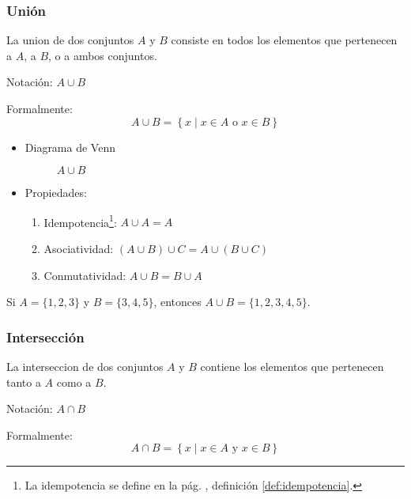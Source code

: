 \subsubsection{Unión }
\vspace{1em} 
\begin{fmd-definition}[Unión]
	La \gls{union} de dos conjuntos \(A\) y \(B\) consiste en todos los elementos que pertenecen a \(A\), a \(B\), o a ambos conjuntos.
	
	Notación: \(A \cup B\)
	
	Formalmente:
	\[ A \cup B = \left\{ x \mid x \in A \mbox{ o } x \in B \right\} \]
\end{fmd-definition}

\begin{itemize}
	\item Diagrama de Venn
	\begin{figure}[H]
		\centering
		\begin{venndiagram2sets}
			\fillA \fillB
		\end{venndiagram2sets}
		\caption*{$A \cup B$}
	\end{figure}
	
	\item Propiedades:
	\begin{enumerate}[label=\roman*)]
		\item Idempotencia\footnote{La idempotencia se define en la pág.  \pageref{def:idempotencia}, definición \ref{def:idempotencia}.}: \( A \cup A = A \)
		\item Asociatividad: \( \left( A \cup B \right) \cup C = A \cup \left( B \cup C \right) \)
		\item Conmutatividad: \( A \cup B = B \cup A\)
	\end{enumerate}
\end{itemize}

\begin{example}[Unión]
	Si \(A = \{1, 2, 3\}\) y \(B = \{3, 4, 5\}\), entonces \(A \cup B = \{1, 2, 3, 4, 5\}\).
\end{example}

\subsubsection{Intersección }
\vspace{1em} 
\begin{fmd-definition}[Intersección]
	La \gls{interseccion} de dos conjuntos \(A\) y \(B\) contiene los elementos que pertenecen tanto a \(A\) como a \(B\).
	
	Notación: \(A \cap B\)
	
	Formalmente:
	\[ A \cap B = \left\{ x \mid x \in A \mbox{ y } x \in B \right\} \]
\end{fmd-definition}

